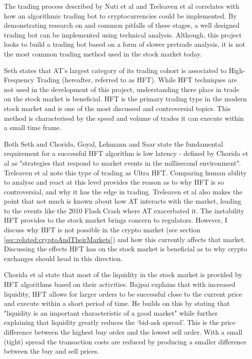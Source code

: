 The trading process described by Nuti et al \cite{ART:Nuti:2011} and Treleaven et al \cite{ART:Treleaven:2013} correlates with how an algorithmic trading bot to cryptocurrencies could be implemented. By demonstrating research on and common pitfalls of these stages, a well designed trading bot can be implemented using technical analysis. Although, this project looks to build a trading bot based on a form of slower pretrade analysis, it is not the most common trading method used in the stock market today. 

\bigskip
\noindent  Seth \cite{WEB:SETH:0001} states that AT's largest category of its trading cohort is associated to High-Frequency Trading (hereafter, referred to as HFT). While HFT techniques are not used in the development of this project, understanding there place in trade on the stock market is beneficial. HFT is the primary trading type in the modern stock market and is one of the most discussed and controversial topics. This method is characterised by the speed and volume of trades it can execute within a small time frame.

Both Seth \cite{WEB:SETH:0001} and Chorida, Goyal, Lehmann and Saar \cite{REPORT:ChordiaEtAl:2013} state the fundamental requirement for a successful HFT algorithm is low latency - defined by Chorida et al as "strategies that respond to market events in the millisecond environment". Treleaven et al \cite{ART:Treleaven:2013} note this type of trading as Ultra HFT. Comparing human ability to analyse and react at this level provides the reason as to why HFT is so controversial, and why it has the edge in trading. Treleaven et al \cite{ART:Treleaven:2013} also makes the point that not much is known about how AT interacts with the market, leading to the events like the 2010 Flash Crash where AT exacerbated it. The instability HFT provides to the stock market brings concern to regulators. However, I discuss why HFT is not possible in the crypto market (see section \ref{sec:related:cryptoAndTheirMarkets}) and how this currently affects that market. Discussing the effects HFT has on the stock market is beneficial as to why crypto exchanges should head in this direction.

\bigskip
\noindent Chorida et al \cite{REPORT:ChordiaEtAl:2013} state that most of the liquidity in the stock market is provided by HFT algorithms based on their activities. Bajpai \cite{WEB:Bajpai:0001} explains that with increased liquidity, HFT allows for larger orders to be successful close to the current price and execute within a short period of time. He builds on this by stating that "liquidity is an important characteristic of a good market" while further explaining that liquidity greatly reduces the `bid-ask spread'. This is the price difference between the highest buy order and the lowest sell order. With a small (tight) spread the transaction costs are reduced by producing a smaller difference between the buy and sell prices. 

